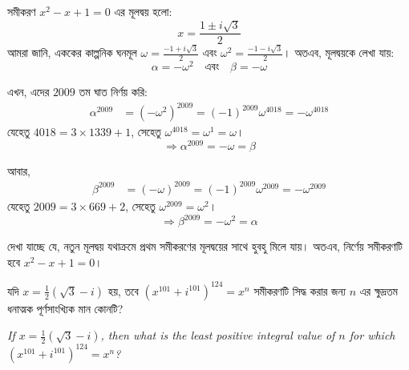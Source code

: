 \documentclass[12pt, a4paper]{article}
\begin{document}
\begin{tcolorbox}[solutionbox={সমাধান (Solution)}]
    \noindent
    সমীকরণ $x^2 - x + 1 = 0$ এর মূলদ্বয় হলো:
    \[ x = \frac{1 \pm i\sqrt{3}}{2} \]
    আমরা জানি, এককের কাল্পনিক ঘনমূল $\omega = \frac{-1 + i\sqrt{3}}{2}$ এবং $\omega^2 = \frac{-1 - i\sqrt{3}}{2}$। অতএব, মূলদ্বয়কে লেখা যায়:
    \[ \alpha = -\omega^2 \quad \text{এবং} \quad \beta = -\omega \]
    
    \vspace{0.5em}
    \noindent এখন, এদের $2009$ তম ঘাত নির্ণয় করি:
    \begin{align*}
        \alpha^{2009} &= (-\omega^2)^{2009} = (-1)^{2009} \omega^{4018} = -\omega^{4018}
    \end{align*}
    যেহেতু $4018 = 3 \times 1339 + 1$, সেহেতু $\omega^{4018} = \omega^1 = \omega$।
    \[ \Rightarrow \alpha^{2009} = -\omega = \beta \]
    
    \vspace{0.5em}
    আবার,
    \begin{align*}
        \beta^{2009} &= (-\omega)^{2009} = (-1)^{2009} \omega^{2009} = -\omega^{2009}
    \end{align*}
    যেহেতু $2009 = 3 \times 669 + 2$, সেহেতু $\omega^{2009} = \omega^2$।
    \[ \Rightarrow \beta^{2009} = -\omega^2 = \alpha \]
    
    \vspace{0.5em}
    দেখা যাচ্ছে যে, নতুন মূলদ্বয় যথাক্রমে প্রথম সমীকরণের মূলদ্বয়ের সাথে হুবহু মিলে যায়। 
    অতএব, নির্ণেয় সমীকরণটি হবে $x^2 - x + 1 = 0$।
\end{tcolorbox}

\vspace{1.5em}

\begin{tcolorbox}[questionbox={প্রশ্ন (Question) 2}]
    \noindent
    যদি $x = \frac{1}{2}(\sqrt{3} - i)$ হয়, তবে $(x^{101} + i^{101})^{124} = x^n$ সমীকরণটি সিদ্ধ করার জন্য $n$ এর ক্ষুদ্রতম ধনাত্মক পূর্ণসাংখ্যিক মান কোনটি?
    
    \vspace{0.8em}
    \begin{english}
    \noindent\textit{\color{darkgray}
    If $x = \frac{1}{2}(\sqrt{3} - i)$, then what is the least positive integral value of $n$ for which $(x^{101} + i^{101})^{124} = x^n$?
    }
    \end{english}
\end{tcolorbox}
\end{document}
